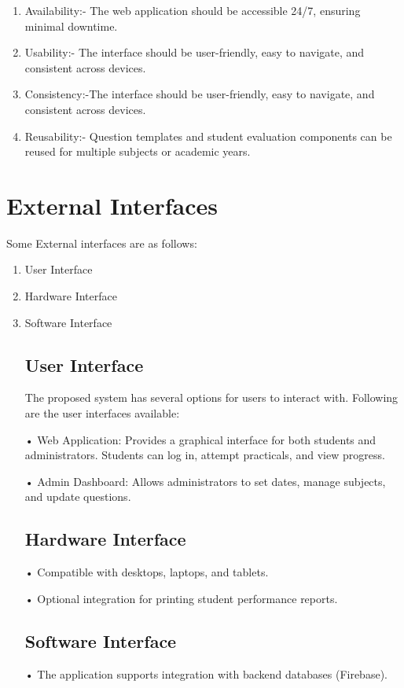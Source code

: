 \begin{enumerate}
\begin{enumerate}
   \item  Availability:- The web application should be accessible 24/7, ensuring minimal downtime.
   
  \item Usability:- The interface should be user-friendly, easy to navigate, and consistent across devices.

   \item Consistency:-The interface should be user-friendly, easy to navigate, and consistent across devices.
   
  \item Reusability:- Question templates and student evaluation components can be reused for multiple subjects or academic years.

\end{enumerate} 

\section {External Interfaces}
Some External interfaces are as follows:
\begin{enumerate}
    \item User Interface
    \item Hardware Interface
    \item Software Interface

 
\subsection{User Interface}
  The proposed system has several options for users to interact with. Following are the user interfaces available:

    •	Web Application:
Provides a graphical interface for both students and administrators. Students can log in, attempt practicals, and view progress.

•	Admin Dashboard:
Allows administrators to set dates, manage subjects, and update questions.

   

   

\subsection{Hardware Interface}
  •	Compatible with desktops, laptops, and tablets.

•	Optional integration for printing student performance reports.


\subsection{Software Interface}
 •	The application supports integration with backend databases (Firebase).


\end{enumerate}
\end{enumerate}
